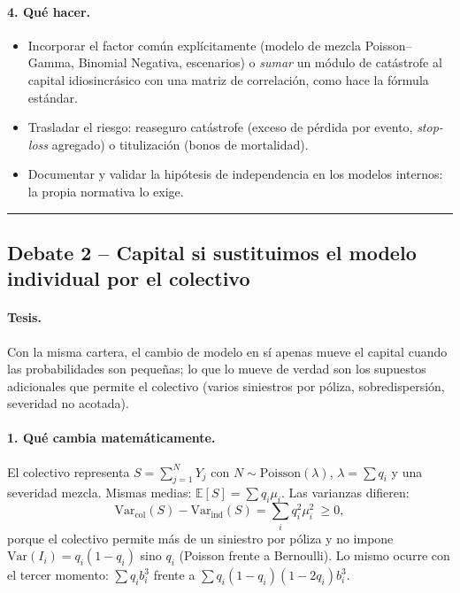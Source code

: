 \documentclass[a4paper,12pt]{article}
\newcommand{\E}{\mathbb{E}}
\newcommand{\Var}{\mathrm{Var}}
\begin{document}
\paragraph{4. Qu\'e hacer.}
\begin{itemize}[leftmargin=*,itemsep=1pt]
\item Incorporar el factor com\'un expl\'icitamente (modelo de mezcla Poisson--Gamma, Binomial Negativa, escenarios) o \emph{sumar} un m\'odulo de cat\'astrofe al capital idiosincr\'asico con una matriz de correlaci\'on, como hace la f\'ormula est\'andar.
\item Trasladar el riesgo: reaseguro cat\'astrofe (exceso de p\'erdida por evento, \emph{stop-loss} agregado) o titulizaci\'on (bonos de mortalidad).
\item Documentar y validar la hip\'otesis de independencia en los modelos internos: la propia normativa lo exige.
\end{itemize}

\bigskip\hrule\bigskip

\subsection{Debate 2 -- Capital si sustituimos el modelo individual por el colectivo}

\paragraph{Tesis.} Con la misma cartera, el cambio de modelo en s\'i apenas mueve el capital cuando las probabilidades son peque\~nas; lo que lo mueve de verdad son los supuestos adicionales que permite el colectivo (varios siniestros por p\'oliza, sobredispersi\'on, severidad no acotada).

\paragraph{1. Qu\'e cambia matem\'aticamente.} El colectivo representa $S=\sum_{j=1}^NY_j$ con $N\sim\text{Poisson}(\lambda)$, $\lambda=\sum q_i$ y una severidad mezcla. Mismas medias: $\E[S]=\sum q_i\mu_i$. Las varianzas difieren:
\[
\Var_{\text{col}}(S)-\Var_{\text{ind}}(S)=\sum_i q_i^2\mu_i^2\ \ge0 ,
\]
porque el colectivo permite m\'as de un siniestro por p\'oliza y no impone $\Var(I_i)=q_i(1-q_i)$ sino $q_i$ (Poisson frente a Bernoulli). Lo mismo ocurre con el tercer momento: $\sum q_ib_i^3$ frente a $\sum q_i(1-q_i)(1-2q_i)b_i^3$.
\end{document}
